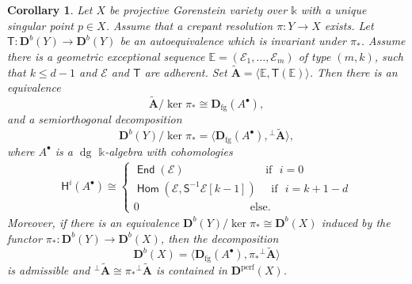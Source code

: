 \documentclass[a4paper,11pt, reqno]{amsart}
\def\E{\mathbb E}
\def\AA{\mathbf A}
\def\DD{\mathbf D}
\def\sE{\mathscr{E}}
\def\dg{{\operatorname{dg}}}
\newcommand{\opname}[1]{\operatorname{\mathsf{#1}}}
\newcommand{\Hom}{\opname{Hom}}
\newcommand{\End}{\opname{End}}
\def\Db{\DD^b}
\def\Dperf{\DD^{\mathrm{perf}}}
\newcommand{\bH}{\mathsf{H}}
\newcommand{\bS}{\mathsf{S}}
\newcommand{\bT}{\mathsf{T}}
\theoremstyle{plain}
\newtheorem{corollary}[dummy]{Corollary}
\theoremstyle{definition}
\numberwithin{equation}{section}
\begin{document}
\begin{corollary}\label{cor:veriderloc-negative-dg}
Let $X$ be projective Gorenstein variety over $\mathbb k$ with a unique  singular point $p\in X$. Assume that a crepant resolution $\pi\colon Y \to X$ exists. 
Let $\bT \colon \Db( Y ) \to \Db ( Y )$ be an autoequivalence which is invariant under $\pi_\ast$.
Assume there is a geometric exceptional sequence $\E = ( \sE_1, \ldots, \sE_{m} )$ of type $(m,k)$, such that $k \leq d-1$ and $\sE$ and $\bT$ are adherent.
Set $\tilde{\AA}=\langle \E, \bT ( \E ) \rangle$.
Then there is an equivalence
\[
\tilde{\AA} / \ker\pi_\ast \cong \DD_{\mathrm{fg}} ( A^\bullet ) ,
\]
and a semiorthogonal decomposition
\begin{equation}\label{eq:sod-quot1-b}
    \Db (Y) /\ker \pi_\ast = \langle \DD_{\mathrm{fg}} ( A^\bullet ) ,   {^{\perp}\tilde{\AA}} \rangle  ,
\end{equation}
where $A^\bullet$ is a $\dg$ $\mathbb k$-algebra with cohomologies
\begin{align}
  \bH^i(A^\bullet) \cong \begin{cases}
      \End(\sE)  \quad \qquad \qquad \qquad \text{ if } \, \, i=0 \\
      \Hom ( \sE , \bS^{-1}\sE [k-1] ) \quad \text{ if } \, \, i=k+1-d \\
      0  \,\,\,\, \quad \qquad \qquad \qquad \qquad \text{ else.}
      \end{cases}  
\end{align}
Moreover, if there is an equivalence $\Db (Y) /\ker \pi_\ast \cong \Db(X)$ induced by the functor $\pi_\ast \colon \Db(Y) \to \Db(X)$, then the decomposition
\begin{equation}\label{eq:sod-quot2-b}
    \Db (X) = \langle \DD_{\mathrm{fg}} ( A^\bullet ) ,  \pi_\ast {^{\perp}\tilde{\AA}} \rangle 
\end{equation}
is admissible and $ {^{\perp}\tilde{\AA}} \cong \pi_\ast {^{\perp}\tilde{\AA}}$
is contained in $ \Dperf(X)$.
\end{corollary}
\end{document}
